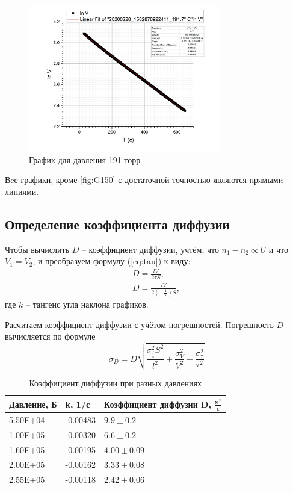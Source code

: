 \documentclass[a4paper]{article}
\begin{document}
\begin{figure}[p]
	\centering
		\includegraphics[width=0.75\textwidth]{G191.jpg}
	\caption{График для давления 191 торр}
	\label{fig:G191}
\end{figure}
Вcе графики, кроме \ref{fig:G150} с достаточной точностью являются прямыми линиями.
\subsection{Определение коэффициента диффузии}
Чтобы вычислить $D$ -- коэффициент диффузии, учтём, что $n_1 - n_2 \propto U$ и что $V_1 = V_2$, и преобразуем формулу (\ref{eq:tau}) к виду:
\begin{eqnarray}
D = \frac{l V}{2 \tau S}, \\
D = \frac{l V}{2 (-\frac{1}{k}) S},
\label{eq:Расчётная}
\end{eqnarray}
где $k$ -- тангенс угла наклона графиков.

Расчитаем коэффициент диффузии с учётом погрешностей. Погрешность $D$ вычисляется по формуле 
\begin{equation}
\sigma_D = D \sqrt{\frac{\sigma^{2}_{\frac{l}{s}} S^2}{l^2} + \frac{\sigma^{2}_{V}}{V^2} + \frac{\sigma^{2}_{\tau}}{\tau^2}}
\label{eq:}
\end{equation}

\begin{table}[htbp]
	\centering
		\begin{tabular}{|l|l|l|}
\hline
Давление, Б & k, 1/с   & Коэффициент диффузии D, $\frac{м^2}{с}$ \\ \hline
5.50E+04    & -0.00483 & $9.9 \pm 0.2$                       \\ \hline
1.00E+05    & -0.00320 & $6.6 \pm 0.2$                        \\ \hline
1.60E+05    & -0.00195 & $4.00 \pm 0.09$                         \\ \hline
2.00E+05    & -0.00162 & $3.33 \pm 0.08$                          \\ \hline
2.55E+05    & -0.00118 & $2.42 \pm 0.06$                           \\ \hline
\end{tabular}
	\caption{Коэффициент диффузии при разных давлениях}
	\label{tab:КоэффициентДиффузииПриРазныхДавлениях}
\end{table}
\end{document}
